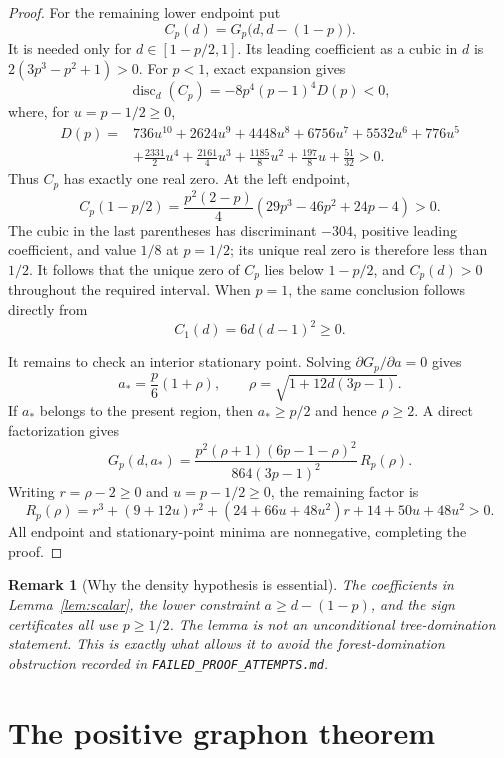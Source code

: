 \documentclass[11pt]{article}
\newtheorem{remark}[theorem]{Remark}
\begin{document}
\begin{proof}
For the remaining lower endpoint put
\[
 C_p(d)=G_p\bigl(d,d-(1-p)\bigr).
\]
It is needed only for $d\in[1-p/2,1]$.  Its leading coefficient as a cubic
in $d$ is $2(3p^3-p^2+1)>0$.  For $p<1$, exact expansion gives
\[
 \operatorname{disc}_d(C_p)
 =-8p^4(p-1)^4D(p)<0,
\]
where, for $u=p-1/2\geq0$,
\begin{align*}
 D(p)={}&736u^{10}+2624u^9+4448u^8+6756u^7+5532u^6
 +776u^5\\
 &+\frac{2331}{2}u^4+\frac{2161}{4}u^3
 +\frac{1185}{8}u^2+\frac{197}{8}u+\frac{51}{32}>0.
\end{align*}
Thus $C_p$ has exactly one real zero.  At the left endpoint,
\[
 C_p(1-p/2)
 =\frac{p^2(2-p)}4(29p^3-46p^2+24p-4)>0.
\]
The cubic in the last parentheses has discriminant $-304$, positive leading
coefficient, and value $1/8$ at $p=1/2$; its unique real zero is therefore
less than $1/2$.  It follows that the unique zero of $C_p$ lies below
$1-p/2$, and $C_p(d)>0$ throughout the required interval.  When $p=1$,
the same conclusion follows directly from
\[
 C_1(d)=6d(d-1)^2\geq0.
\]

It remains to check an interior stationary point.  Solving
$\partial G_p/\partial a=0$ gives
\[
 a_* =\frac p6(1+\rho),
 \qquad
 \rho=\sqrt{1+12d(3p-1)}.
\]
If $a_*$ belongs to the present region, then $a_*\geq p/2$ and hence
$\rho\geq2$.  A direct factorization gives
\[
 G_p(d,a_*)
 =\frac{p^2(\rho+1)(6p-1-\rho)^2}
 {864(3p-1)^2}\,R_p(\rho).
\]
Writing $r=\rho-2\geq0$ and $u=p-1/2\geq0$, the remaining factor is
\[
 R_p(\rho)
 =r^3+(9+12u)r^2+(24+66u+48u^2)r
  +14+50u+48u^2>0.
\]
All endpoint and stationary-point minima are nonnegative, completing the
proof.
\end{proof}

\begin{remark}[Why the density hypothesis is essential]
The coefficients in Lemma~\ref{lem:scalar}, the lower constraint
$a\geq d-(1-p)$, and the sign certificates all use $p\geq1/2$.  The lemma
is not an unconditional tree-domination statement.  This is exactly what
allows it to avoid the forest-domination obstruction recorded in
\texttt{FAILED\_PROOF\_ATTEMPTS.md}.
\end{remark}


\section{The positive graphon theorem}
\end{document}
